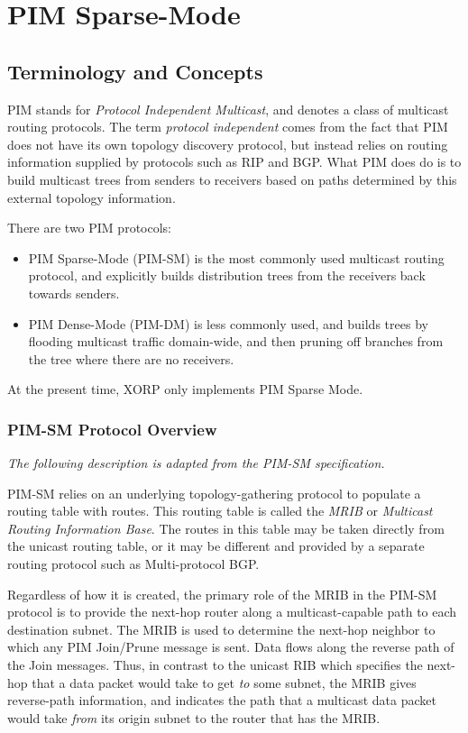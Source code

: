 %
%

\chapter{PIM Sparse-Mode}
\label{pimsm}

\section{Terminology and Concepts}

PIM stands for {\it Protocol Independent Multicast}, and denotes a
class of multicast routing protocols.  The term {\it protocol
independent} comes from the fact that PIM does not have its own
topology discovery protocol, but instead relies on routing information
supplied by protocols such as RIP and BGP.  What PIM does do is to
build multicast trees from senders to receivers based on paths
determined by this external topology information.  

There are two PIM protocols:
\begin{itemize}
\item PIM Sparse-Mode (PIM-SM) is the most commonly used multicast
  routing protocol, and explicitly builds distribution trees from the
  receivers back towards senders.
\item PIM Dense-Mode (PIM-DM) is less commonly used, and builds trees
  by flooding multicast traffic domain-wide, and then pruning off
  branches from the tree where there are no receivers.  
\end{itemize}
At the present time, XORP only implements PIM Sparse Mode.

\subsection{PIM-SM Protocol Overview}

{\it The following description is adapted from the PIM-SM
  specification.  }

PIM-SM relies on an underlying topology-gathering protocol to populate a
routing table with routes.  This routing table is called the {\it MRIB} or
{\it Multicast Routing Information Base}.  The routes in this table may be
taken directly from the unicast routing table, or it may be
different and provided by a separate routing protocol such as
Multi-protocol BGP.

Regardless of how it is created, the primary role of the MRIB in the
PIM-SM protocol
is to provide the next-hop router along a multicast-capable
path to each destination subnet.
The MRIB is used to determine the next-hop neighbor to which any PIM
Join/Prune message is sent.
Data flows along the reverse path of the Join messages.
Thus, in contrast to the unicast RIB which specifies the
next-hop that a data packet would take to get {\it to} some subnet,
the MRIB gives reverse-path information, and indicates the path that
a multicast data packet would take {\it from} 
its origin subnet to the router that has the MRIB.  

